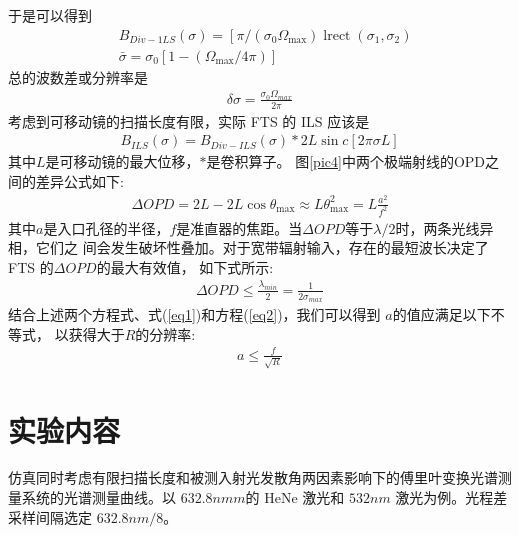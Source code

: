 \documentclass[conference]{IEEEtran}
\begin{document}
于是可以得到
\begin{align}
    &B_{D i v-1 L S}(\sigma)=\left[\pi /\left(\sigma_{0} \Omega_{\max }\right) \operatorname{lrect}\left(\sigma_{1}, \sigma_{2}\right)\right. \\
    &\bar{\sigma}=\sigma_{0}\left[1-\left(\Omega_{\max } / 4 \pi\right)\right]
\end{align}
总的波数差或分辨率是
\begin{align*}
    \delta \sigma = \frac{\sigma_0\Omega_{max}}{2\pi}
\end{align*}
考虑到可移动镜的扫描长度有限，实际 FTS 的 ILS 应该是
\begin{align}
    B_{I L S}(\sigma)=B_{D i v-I L S}(\sigma) * 2 L \sin c[2 \pi \sigma L]
\end{align}
其中$L$是可移动镜的最大位移，$*$是卷积算子。
图\ref{pic4}中两个极端射线的OPD之间的差异公式如下:
\begin{align*}
    \Delta O P D=2 L-2 L \cos \theta_{\max } \approx L \theta_{\max }^{2}=L \frac{a^{2}}{ f^{2}}
\end{align*}
其中$a$是入口孔径的半径，$f$是准直器的焦距。当$\Delta OPD$等于$\lambda/2$时，两条光线异相，它们之
间会发生破坏性叠加。对于宽带辐射输入，存在的最短波长决定了 FTS 的$\Delta OPD$的最大有效值， 如下式所示:
\begin{align}
    \Delta OPD \leq \frac{\lambda_{min}}{2} = \frac{1}{2\sigma_{max}}
\end{align}
结合上述两个方程式、式(\ref{eq1})和方程(\ref{eq2})，我们可以得到 $a$的值应满足以下不等式， 以获得大于$R$的分辨率:
\begin{align}
    a \leq \frac{f}{\sqrt{R}}
\end{align}

\section{实验内容}
仿真同时考虑有限扫描长度和被测入射光发散角两因素影响下的傅里叶变换光谱测量系统的光谱测量曲线。以 $632. 8nmm$的 HeNe 激光和 $532nm$ 激光为例。光程差采样间隔选定 $632. 8nm/8$。
\end{document}
